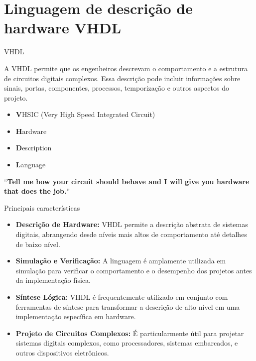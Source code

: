 \documentclass[aspectratio=169]{beamer}
\begin{document}
\section{Linguagem de descrição de hardware VHDL}


\begin{frame}{VHDL}
	\justifying
	
	\begin{block}{}
		\justifying
		A VHDL permite que os engenheiros descrevam o comportamento e a estrutura de circuitos digitais complexos. Essa descrição pode incluir informações sobre sinais, portas, componentes, processos, temporização e outros aspectos do projeto.
	\end{block}
	
	\begin{itemize}
		\item \textbf{V}HSIC (Very High Speed Integrated Circuit)
		\item \textbf{H}ardware
		\item \textbf{D}escription
		\item \textbf{L}anguage
	\end{itemize}
	
\begin{alertblock}{}
``\textbf{Tell me how your circuit should behave and I will give you
hardware that does the job.}”
\end{alertblock}	
	
	
\end{frame}

\begin{frame}{Principais características}
\justifying
	
	\begin{itemize}
		\justifying
		\item \textbf{Descrição de Hardware:} VHDL permite a descrição abstrata de sistemas digitais, abrangendo desde níveis mais altos de comportamento até detalhes de baixo nível.
		\item \textbf{Simulação e Verificação:} A linguagem é amplamente utilizada em simulação para verificar o comportamento e o desempenho dos projetos antes da implementação física.
		\item \textbf{Síntese Lógica:} VHDL é frequentemente utilizado em conjunto com ferramentas de síntese para transformar a descrição de alto nível em uma implementação específica em hardware.
		\item \textbf{Projeto de Circuitos Complexos:} É particularmente útil para projetar sistemas digitais complexos, como processadores, sistemas embarcados, e outros dispositivos eletrônicos.

	\end{itemize}
	
	
\end{frame}
\end{document}

